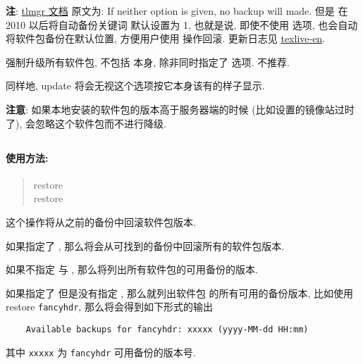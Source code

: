 \begin{description}
    \textbf{注}: \href{https://www.tug.org/texlive/doc/tlmgr.html#update-option...-pkg}{tlmgr 文档} 原文为: If neither option is given, no backup will made. 但是 \tlmgr 在 \tl{}2010 以后将自动备份关键词  默认设置为 1, 也就是说, 即使不使用  选项, 也会自动将软件包备份在默认位置, 方便用户使用  操作回滚. 更新日志见 \href{https://www.tug.org/texlive/doc/texlive-en/texlive-en.html#x1-780009.1.7}{texlive-en}.

    \item {}\par
    强制升级所有软件包, 不包括 \tlmgr 本身, 除非同时指定了  选项. 不推荐. 

    同样地, \ac{update}  将会无视这个选项按它本身该有的样子显示. 
\end{description}

\textbf{注意}: 如果本地安装的软件包的版本高于服务器端的时候 (比如设置的镜像站过时了), \tlmgr 会忽略这个软件包而不进行降级. 

\clearpage

\subsection{}\label{subsec:restore}

\paragraph{使用方法:}

\begin{quote}
    \ac{restore}   \\
    \ac{restore} 
\end{quote}

这个操作将从之前的备份中回滚软件包版本. 

如果指定了 , 那么将会从可找到的备份中回滚所有的软件包版本. 

如果不指定  与 , 那么将列出所有软件包的可用备份的版本. 

如果指定了  但是没有指定 , 那么就列出软件包  的所有可用的备份版本, 比如使用 \tlmgr{} \ac{restore} \texttt{fancyhdr}, 那么将会得到如下形式的输出
\begin{verbatim}
    Available backups for fancyhdr: xxxxx (yyyy-MM-dd HH:mm)
\end{verbatim}
其中 \texttt{xxxxx} 为 \texttt{fancyhdr} 可用备份的版本号.

